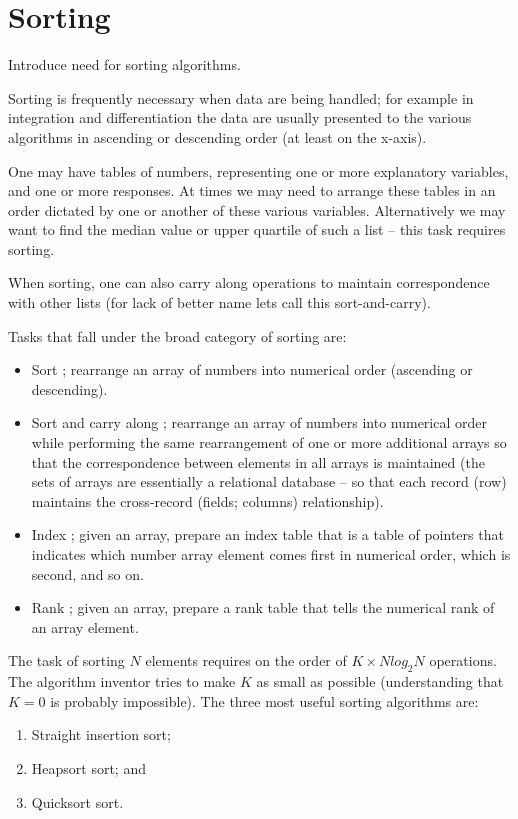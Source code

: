 \section{Sorting}
Introduce need for sorting algorithms.  

Sorting is frequently necessary when data are being handled; for example in integration and differentiation the data are usually presented to the various algorithms in ascending or descending order (at least on the x-axis).

One may have tables of numbers, representing one or more explanatory variables, and one or more responses.   At times we may need to arrange these tables in an order dictated by one or another of these various variables.  
Alternatively we may want to find the median value or upper quartile of such a list -- this task requires sorting.  

When sorting, one can also carry along operations to maintain correspondence with other lists (for lack of better name lets call this sort-and-carry).

Tasks that fall under the broad category of sorting are:
\begin{itemize}
\item Sort ; rearrange an array of numbers into numerical order (ascending or descending).
\item Sort and carry along ; rearrange an array of numbers into numerical order while performing the same rearrangement of one or more additional arrays so that the correspondence between elements in all arrays is maintained (the sets of arrays are essentially a relational database -- so that each record (row) maintains the cross-record (fields; columns) relationship).
\item Index ; given an array, prepare an index table that is a table of pointers that indicates which number array element comes first in numerical order, which is second, and so on.
\item Rank ; given an array, prepare a rank table that tells the numerical rank of an array element.
\end{itemize}

The task of sorting $N$ elements requires on the order of $K \times N log_2 N$  operations.  The algorithm inventor tries to make $K$ as small as possible (understanding that $K=0$ is probably impossible).  
The three most useful sorting algorithms are:
\begin{enumerate}
\item Straight insertion sort;
\item Heapsort sort; and
\item Quicksort sort.
\end{enumerate}

